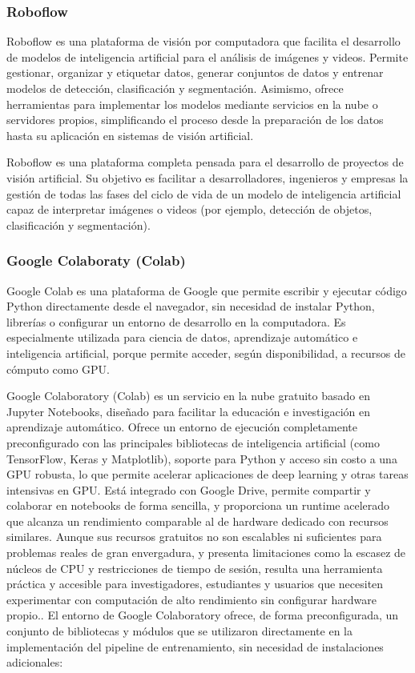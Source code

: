 \subsubsection{Roboflow}	

Roboflow es una plataforma de visión por computadora que facilita el desarrollo de modelos de inteligencia artificial para el análisis de imágenes y videos. Permite gestionar, organizar y etiquetar datos, generar conjuntos de datos y entrenar modelos de detección, clasificación y segmentación. Asimismo, ofrece herramientas para implementar los modelos mediante servicios en la nube o servidores propios, simplificando el proceso desde la preparación de los datos hasta su aplicación en sistemas de visión artificial.

Roboflow es una plataforma completa pensada para el desarrollo de proyectos de visión artificial. Su objetivo es facilitar a desarrolladores, ingenieros y empresas la gestión de todas las fases del ciclo de vida de un modelo de inteligencia artificial capaz de interpretar imágenes o videos (por ejemplo, detección de objetos, clasificación y segmentación). \cite{RoboflowInc2025}

\subsubsection{Google Colaboraty (Colab)}

Google Colab es una plataforma de Google que permite escribir y ejecutar código Python directamente desde el navegador, sin necesidad de instalar Python, librerías o configurar un entorno de desarrollo en la computadora. Es especialmente utilizada para ciencia de datos, aprendizaje automático e inteligencia artificial, porque permite acceder, según disponibilidad, a recursos de cómputo como GPU.

Google Colaboratory (Colab) es un servicio en la nube gratuito basado en Jupyter Notebooks, diseñado para facilitar la educación e investigación en aprendizaje automático. Ofrece un entorno de ejecución completamente preconfigurado con las principales bibliotecas de inteligencia artificial (como TensorFlow, Keras y Matplotlib), soporte para Python y acceso sin costo a una GPU robusta, lo que permite acelerar aplicaciones de deep learning y otras tareas intensivas en GPU. Está integrado con Google Drive, permite compartir y colaborar en notebooks de forma sencilla, y proporciona un runtime acelerado que alcanza un rendimiento comparable al de hardware dedicado con recursos similares. Aunque sus recursos gratuitos no son escalables ni suficientes para problemas reales de gran envergadura, y presenta limitaciones como la escasez de núcleos de CPU y restricciones de tiempo de sesión, resulta una herramienta práctica y accesible para investigadores, estudiantes y usuarios que necesiten experimentar con computación de alto rendimiento sin configurar hardware propio.\textcite{Tcolab2018}.
El entorno de Google Colaboratory ofrece, de forma preconfigurada, un conjunto de bibliotecas y módulos que se utilizaron directamente en la implementación del pipeline de entrenamiento, sin necesidad de instalaciones adicionales:

